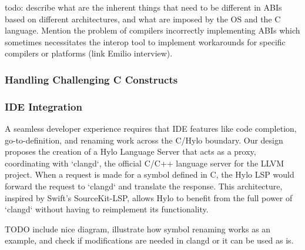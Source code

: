 todo: describe what are the inherent things that need to be different in ABIs based on different architectures, and what are imposed by the OS and the C language. Mention the problem of compilers incorrectly implementing ABIs which sometimes necessitates the interop tool to implement workarounds for specific compilers or platforms (link Emilio interview).

\subsubsection{Handling Challenging C Constructs}


\subsubsection{IDE Integration}

A seamless developer experience requires that IDE features like code completion, go-to-definition, and renaming work across the C/Hylo boundary. Our design proposes the creation of a Hylo Language Server that acts as a proxy, coordinating with `clangd`, the official C/C++ language server for the LLVM project. When a request is made for a symbol defined in C, the Hylo LSP would forward the request to `clangd` and translate the response. This architecture, inspired by Swift's SourceKit-LSP, allows Hylo to benefit from the full power of `clangd` without having to reimplement its functionality.

TODO include nice diagram, illustrate how symbol renaming works as an example, and check if modifications are needed in clangd or it can be used as is.

